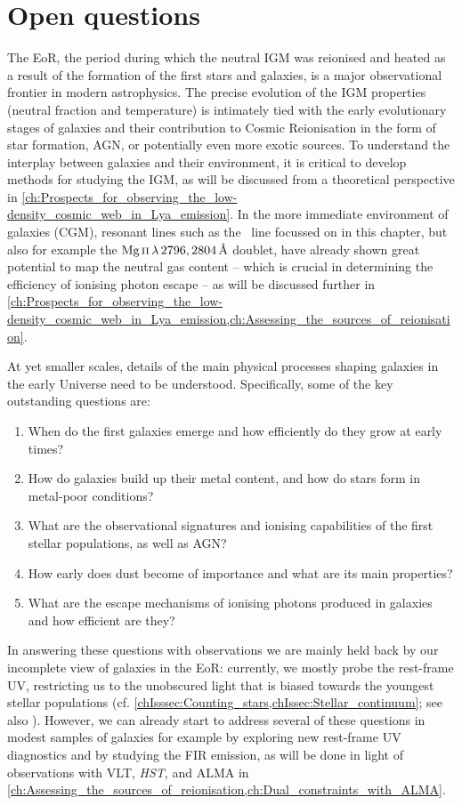 \section{Open questions}

The EoR, the period during which the neutral IGM was reionised and heated as a result of the formation of the first stars and galaxies, is a major observational frontier in modern astrophysics. The precise evolution of the IGM properties (neutral fraction and temperature) is intimately tied with the early evolutionary stages of galaxies and their contribution to Cosmic Reionisation in the form of star formation, AGN, or potentially even more exotic sources. To understand the interplay between galaxies and their environment, it is critical to develop methods for studying the IGM, as will be discussed from a theoretical perspective in \cref{ch:Prospects_for_observing_the_low-density_cosmic_web_in_Lya_emission}. In the more immediate environment of galaxies (CGM), resonant lines such as the \lya\ line focussed on in this chapter, but also for example the $\MgII \, \lambda \, 2796, 2804 \, \Angstrom$ doublet, have already shown great potential to map the neutral gas content -- which is crucial in determining the efficiency of ionising photon escape -- as will be discussed further in \cref{ch:Prospects_for_observing_the_low-density_cosmic_web_in_Lya_emission,ch:Assessing_the_sources_of_reionisation}.

At yet smaller scales, details of the main physical processes shaping galaxies in the early Universe need to be understood. Specifically, some of the key outstanding questions are:
\begin{enumerate}[label=(\roman*)]
    \item When do the first galaxies emerge and how efficiently do they grow at early times?
    \item How do galaxies build up their metal content, and how do stars form in metal-poor conditions?
    \item What are the observational signatures and ionising capabilities of the first stellar populations, as well as AGN?
    \item How early does dust become of importance and what are its main properties?
    \item What are the escape mechanisms of ionising photons produced in galaxies and how efficient are they?
\end{enumerate}

In answering these questions with observations we are mainly held back by our incomplete view of galaxies in the EoR: currently, we mostly probe the rest-frame UV, restricting us to the unobscured light that is biased towards the youngest stellar populations (cf. \cref{chIsssec:Counting_stars,chIssec:Stellar_continuum}; see also \citealt{2022arXiv220803281T}). However, we can already start to address several of these questions in modest samples of galaxies for example by exploring new rest-frame UV diagnostics and by studying the FIR emission, as will be done in light of observations with VLT, \textit{HST}, and ALMA in \cref{ch:Assessing_the_sources_of_reionisation,ch:Dual_constraints_with_ALMA}.

